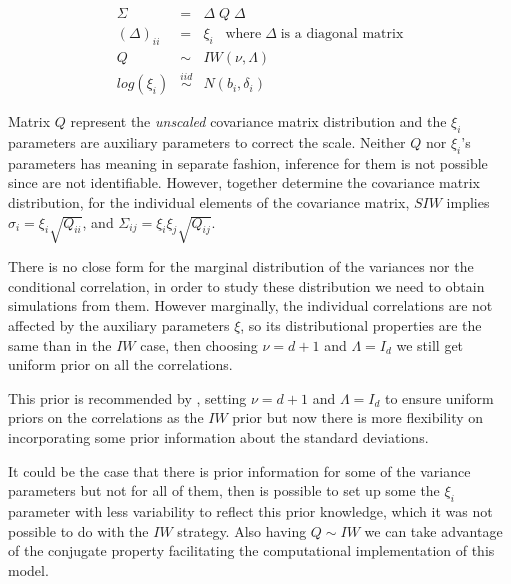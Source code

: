 \documentclass{article}
\begin{document}
\begin{eqnarray}
\nonumber \Sigma &=& \Delta \; Q \; \Delta \\ 
\nonumber  (\Delta)_{ii} &=& \xi_i \;\; \; \mbox{where} \; \Delta \; \mbox{is a diagonal matrix} \\
\nonumber  Q &  \sim  & IW(\nu, \Lambda) \\
log(\xi_i) & \stackrel{iid} \sim& N(b_i, \delta_i)
\label{eq:siw}
\end{eqnarray}

Matrix $Q$ represent the \textsl{unscaled} covariance matrix distribution and the $\xi_i$ parameters are auxiliary parameters to correct the scale. Neither $Q$ nor $\xi_i$'s  parameters has meaning in separate fashion, inference for them is not possible since are not identifiable.  However, together determine the covariance matrix distribution, for the individual elements of the covariance matrix, $SIW$ implies $\sigma_i = \xi_i \sqrt{Q_{ii}}$, and $\Sigma_{ij}=\xi_i\xi_j\sqrt{Q_{ij}}$.   

There is no close form for the marginal distribution of the variances nor the conditional correlation, in order to study these distribution we need to obtain simulations from them. However marginally, the individual correlations are not affected by the auxiliary parameters $\xi$, so its distributional properties are the same than in the $IW$ case, then choosing $\nu=d+1$ and $ \Lambda=I_d$ we still get uniform prior on all the correlations. 

This prior is recommended by \cite{gelmanhill}, setting $\nu=d+1$ and $\Lambda=I_d$ to ensure uniform priors on the correlations as the $IW$ prior but now there is more flexibility on incorporating some prior information about the standard deviations.

 It could be the case that there is prior information for some of the variance parameters but not for all of them, then is possible to set up some the $\xi_i$ parameter with less variability to reflect this prior knowledge, which it was not possible to do with the $IW$ strategy. Also having $Q\sim IW$ we can take advantage of the conjugate property facilitating the computational implementation of this model. 
\end{document}
